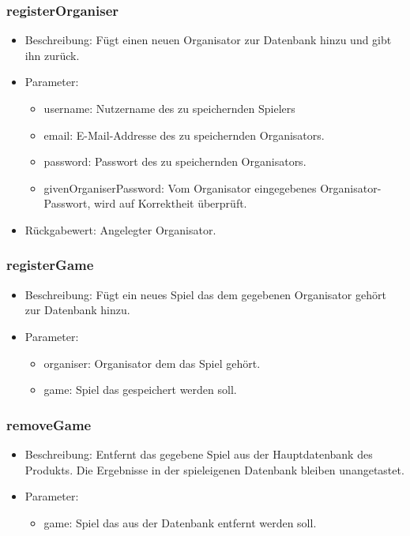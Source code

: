 \documentclass[a4paper]{scrreprt}
\begin{document}
    \subsubsection{registerOrganiser}
    \begin{itemize}
        \item Beschreibung: Fügt einen neuen Organisator zur Datenbank hinzu und gibt ihn zurück.
        \item Parameter:
        \begin{itemize}
            \item username: Nutzername des zu speichernden Spielers
            \item email: E-Mail-Addresse des zu speichernden Organisators.
            \item password: Passwort des zu speichernden Organisators.
            \item givenOrganiserPassword: Vom Organisator eingegebenes Organisator-Passwort, wird auf Korrektheit überprüft.
        \end{itemize}
        \item Rückgabewert: Angelegter Organisator.
    \end{itemize}

    \subsubsection{registerGame}
    \begin{itemize}
        \item Beschreibung: Fügt ein neues Spiel das dem gegebenen Organisator gehört zur Datenbank hinzu.
        \item Parameter:
        \begin{itemize}
            \item organiser: Organisator dem das Spiel gehört.
            \item game: Spiel das gespeichert werden soll.
        \end{itemize}
    \end{itemize}

    \subsubsection{removeGame}
    \begin{itemize}
        \item Beschreibung: Entfernt das gegebene Spiel aus der Hauptdatenbank des Produkts.
        Die Ergebnisse in der spieleigenen Datenbank bleiben unangetastet.
        \item Parameter:
        \begin{itemize}
            \item game: Spiel das aus der Datenbank entfernt werden soll.
        \end{itemize}
    \end{itemize}
\end{document}
